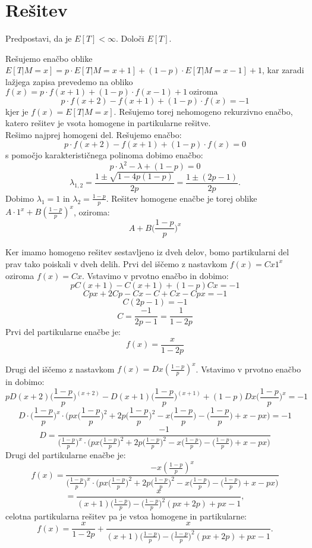 \documentclass[12pt, a4paper]{article}
\begin{document}
\section[Rešitev]{Rešitev}
Predpostavi, da je $E[T] < \infty$. Določi $E[T]$.
\bigskip

Rešujemo enačbo oblike $E[T|M=x] = p\cdot E[T|M=x+1] + (1-p)\cdot E[T|M=x-1] + 1$, kar zaradi lažjega zapisa prevedemo na obliko $f(x) = p\cdot f(x+1) + (1-p) \cdot f(x-1) + 1 ~ \textrm{oziroma} $ $$p\cdot f(x+2) - f(x+1) + (1-p)\cdot f(x) = -1$$ kjer je $f(x)=E[T|M=x]$. Rešujemo torej nehomogeno rekurzivno enačbo, katero rešitev je vsota homogene in partikularne rešitve. 
\\
Rešimo najprej homogeni del. Rešujemo enačbo: $$p\cdot f(x+2) - f(x+1) + (1-p)\cdot f(x) = 0$$ s pomočjo karakterističnega polinoma dobimo enačbo: $$p\cdot  \lambda ^2 - \lambda + (1-p) = 0$$ $$\lambda _{1, 2}= \frac{1 \pm \sqrt{1 - 4p(1-p)}}{2p} = \frac{1 \pm (2p-1)}{2p}.$$
Dobimo $\lambda _{1} = 1$ in $\lambda _{2} = \frac{1-p}{p}$. Rešitev homogene enačbe je torej oblike $A\cdot 1^x + B(\frac{1-p}{p})^x$, oziroma: $$A+ B \bigg( \frac{1-p}{p} \bigg )^x$$

Ker imamo homogeno rešitev sestavljeno iz dveh delov, bomo partikularni del prav tako poiskali v dveh delih. Prvi del iščemo z nastavkom $f(x)= Cx1^x$ oziroma $f(x)= Cx$. Vstavimo v prvotno enačbo in dobimo: $$pC(x+1)-C(x+1)+(1-p)Cx=-1$$ $$Cpx+2Cp-Cx-C+Cx-Cpx=-1$$ $$C(2p-1)=-1$$ $$C=\frac{-1}{2p-1} = \frac{1}{1-2p}$$ Prvi del partikularne enačbe je: $$f(x)=\frac{x}{1-2p}$$

Drugi del iščemo z nastavkom $f(x) = D x (\frac{1-p}{p})^x$. Vstavimo v prvotno enačbo in dobimo:
$$pD(x+2)\bigg( \frac{1-p}{p} \bigg )^{(x+2)} - D(x+1)\bigg( \frac{1-p}{p} \bigg )^{(x+1 )}+(1-p)Dx\bigg( \frac{1-p}{p} \bigg )^x = -1$$ $$D \cdot \bigg( \frac{1-p}{p} \bigg )^x \cdot \bigg( px\bigg( \frac{1-p}{p} \bigg )^2 + 2p\bigg( \frac{1-p}{p} \bigg )^2 -x\bigg( \frac{1-p}{p} \bigg )-\bigg( \frac{1-p}{p} \bigg )+x-px \bigg )= -1$$ $$D = \frac{-1}{\bigg( \frac{1-p}{p} \bigg )^x \cdot \bigg( px\bigg( \frac{1-p}{p} \bigg )^2 + 2p\bigg( \frac{1-p}{p} \bigg )^2 -x\bigg( \frac{1-p}{p} \bigg )-\bigg( \frac{1-p}{p} \bigg )+x-px \bigg )}$$ Drugi del partikularne enačbe je: $$f(x) = \frac{-x  (\frac{1-p}{p})^x}{\bigg( \frac{1-p}{p} \bigg )^x \cdot \bigg( px\bigg( \frac{1-p}{p} \bigg )^2 + 2p\bigg( \frac{1-p}{p} \bigg )^2 -x\bigg( \frac{1-p}{p} \bigg )-\bigg( \frac{1-p}{p} \bigg )+x-px \bigg )}$$ $$= \frac{x}{(x+1)\bigg( \frac{1-p}{p} \bigg )-\bigg( \frac{1-p}{p} \bigg )^2(px+2p)+px-1},$$
celotna partikularna rešitev pa je vstoa homogene in partikularne: $$f(x)=\frac{x}{1-2p}+\frac{x}{(x+1)\bigg( \frac{1-p}{p} \bigg )-\bigg( \frac{1-p}{p} \bigg )^2(px+2p)+px-1}.$$
\end{document}
